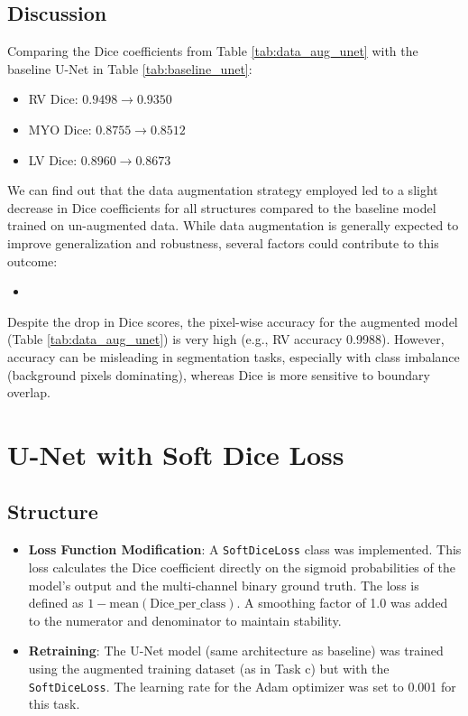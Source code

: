 \documentclass{article}
\begin{document}
\subsection{Discussion}
Comparing the Dice coefficients from Table \ref{tab:data_aug_unet} with the baseline U-Net in Table \ref{tab:baseline_unet}:
\begin{itemize}
  \item RV Dice: $0.9498 \rightarrow 0.9350$
  \item MYO Dice: $0.8755 \rightarrow 0.8512$
  \item LV Dice: $0.8960 \rightarrow 0.8673$
\end{itemize}
We can find out that the data augmentation strategy employed led to a slight decrease in Dice coefficients for all structures compared to the
baseline model trained on un-augmented data. While data augmentation is generally expected to improve generalization and robustness,
several factors could contribute to this outcome:
\begin{itemize}
  \item
\end{itemize}
Despite the drop in Dice scores, the pixel-wise accuracy for the augmented model (Table \ref{tab:data_aug_unet}) is very high
(e.g., RV accuracy 0.9988). However, accuracy can be misleading in segmentation tasks, especially with class imbalance
(background pixels dominating), whereas Dice is more sensitive to boundary overlap.



\section{U-Net with Soft Dice Loss}

\subsection{Structure}
\begin{itemize}
  \item \textbf{Loss Function Modification}: A \texttt{SoftDiceLoss} class was implemented. This loss calculates the Dice
        coefficient directly on the sigmoid probabilities of the model's output and the multi-channel binary ground truth. The
        loss is defined as $1 - \text{mean}(\text{Dice\_per\_class})$. A smoothing factor of 1.0 was added to the numerator and
        denominator to maintain stability.
  \item \textbf{Retraining}: The U-Net model (same architecture as baseline) was trained using the augmented training
        dataset (as in Task c) but with the \texttt{SoftDiceLoss}. The learning rate for the Adam optimizer was set to 0.001 for this task.
\end{itemize}
\end{document}

